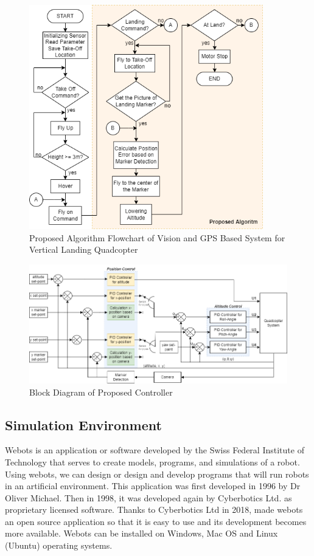 \documentclass[a4paper]{jpconf}
\begin{document}
\begin{figure}[h]
    \centering
    \includegraphics[width=24pc]{flowchart-proposed-algorithm.png}
    \caption{\label{label}Proposed Algorithm Flowchart of Vision and GPS Based System for Vertical Landing Quadcopter}
\end{figure}

\begin{figure}[h]
    \centering
    \includegraphics[width=36pc]{block-diagram-controller.png}
    \caption{\label{label}Block Diagram of Proposed Controller}
\end{figure}

\subsection{Simulation Environment}
Webots is an application or software developed by the Swiss Federal Institute of Technology that serves to create models, programs, and simulations of a robot. Using webots, we can design or design and develop programs that will run robots in an artificial environment. This application was first developed in 1996 by Dr Oliver Michael. Then in 1998, it was developed again by Cyberbotics Ltd. as proprietary licensed software. Thanks to Cyberbotics Ltd in 2018, made webots an open source application so that it is easy to use and its development becomes more available. Webots can be installed on Windows, Mac OS and Linux (Ubuntu) operating systems.
\end{document}
